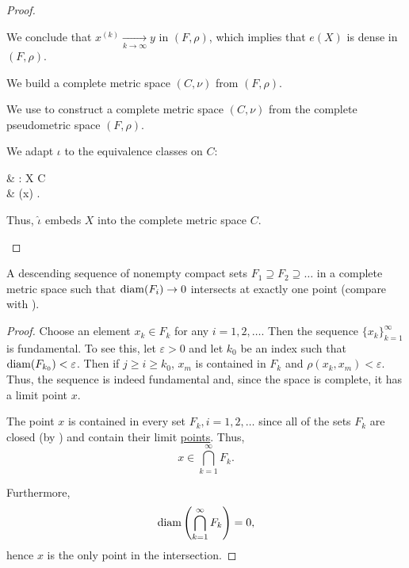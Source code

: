 \begin{proof}
\begin{thmenum}
    We conclude that \( x^{(k)} \xrightarrow[k \to \infty]{} y \) in \( (F, \rho) \), which implies that \( e(X) \) is dense in \( (F, \rho) \).

     We build a complete metric space \( (C, \nu) \) from \( (F, \rho) \).

    We use  to construct a complete metric space \( (C, \nu) \) from the complete pseudometric space \( (F, \rho) \).

    We adapt \( \iota \) to the equivalence classes on \( C \):
    \begin{balign*}
       & \hat\iota: X \to C                 \\
       & \hat\iota(x) \coloneqq [\iota(x)].
    \end{balign*}

    Thus, \( \hat\iota \) embeds \( X \) into the complete metric space \( C \).
  \end{thmenum}
\end{proof}

\begin{theorem}\label{thm:cantors_nested_compact_theorem}
  A descending sequence of nonempty compact sets \( F_1 \supseteq F_2 \supseteq \ldots \) in a complete metric space such that \( \operatorname{diam}(F_i) \to 0 \) intersects at exactly one point (compare with ).
\end{theorem}
\begin{proof}
  Choose an element \( x_k \in F_k \) for any \( i = 1, 2, \ldots \). Then the sequence \( \{ x_k \}_{k=1}^\infty \) is fundamental. To see this, let \( \varepsilon > 0 \) and let \( k_0 \) be an index such that \( \operatorname{diam}(F_{k_0}) < \varepsilon \). Then if \( j \geq i \geq k_0 \), \( x_m \) is contained in \( F_k \) and \( \rho(x_k, x_m) < \varepsilon \). Thus, the sequence is indeed fundamental and, since the space is complete, it has a limit point \( x \).

  The point \( x \) is contained in every set \( F_k, i = 1, 2, \ldots \) since all of the sets \( F_k \) are closed (by ) and contain their limit \hyperref[thm:limit_point_iff_in_closure]{points}. Thus,
  \begin{equation*}
    x \in \bigcap_{k=1}^\infty F_k.
  \end{equation*}

  Furthermore,
  \begin{equation*}
    \operatorname{diam}\left( \bigcap_{k=1}^\infty F_k \right) = 0,
  \end{equation*}
  hence \( x \) is the only point in the intersection.
\end{proof}
